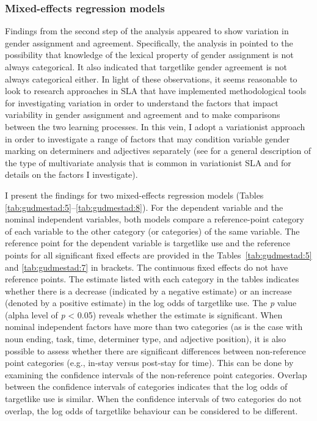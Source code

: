 \documentclass[output=paper,colorlinks,citecolor=brown,modfonts,nonflat]{../langscibook}
\begin{document}
\subsubsection{Mixed-effects regression models}\label{sec:gudmestad:3.2.3}

Findings from the second step of the analysis appeared to show variation in gender assignment and agreement. Specifically, the analysis in  pointed to the possibility that knowledge of the lexical property of gender assignment is not always categorical. It also indicated that targetlike gender agreement is not always categorical either. In light of these observations, it seems reasonable to look to research approaches in SLA that have implemented methodological tools for investigating variation in order to understand the factors that impact variability in gender assignment and agreement and to make comparisons between the two learning processes. In this vein, I adopt a variationist approach in order to investigate a range of factors that may condition variable gender marking on determiners and adjectives separately (see  for a general description of the type of multivariate analysis that is common in variationist SLA and for details on the factors I investigate). 



I present the findings for two mixed-effects regression models (Tables \ref{tab:gudmestad:5}--\ref{tab:gudmestad:8}). For the dependent variable and the nominal independent variables, both models compare a reference-point category of each variable to the other category (or categories) of the same variable. The reference point for the dependent variable is targetlike use and the reference points for all significant fixed effects are provided in the Tables~\ref{tab:gudmestad:5} and \ref{tab:gudmestad:7} in brackets. The continuous fixed effects do not have reference points. The estimate listed with each category in the tables indicates whether there is a decrease (indicated by a negative estimate) or an increase (denoted by a positive estimate) in the log odds of targetlike use. The \textit{p} value (alpha level of \textit{p} < 0.05) reveals whether the estimate is significant. When nominal independent factors have more than two categories (as is the case with noun ending, task, time, determiner type, and adjective position), it is also possible to assess whether there are significant differences between non-reference point categories (e.g., in-stay versus post-stay for time). This can be done by examining the confidence intervals of the non-reference point categories. Overlap between the confidence intervals of categories indicates that the log odds of targetlike use is similar. When the confidence intervals of two categories do not overlap, the log odds of targetlike behaviour can be considered to be different.
\end{document}
